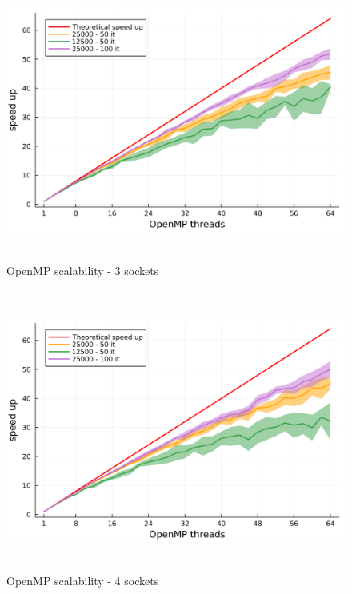 \documentclass[
  letterpaper,
  DIV=11,
  numbers=noendperiod]{scrartcl}
\begin{document}
\begin{figure}

{\centering \includegraphics[width=\textwidth,height=3.64583in]{img/epyc_3_sockets.png}

}

\caption{OpenMP scalability - 3 sockets}

\end{figure}

\begin{figure}

{\centering \includegraphics[width=\textwidth,height=3.64583in]{img/epyc_4_sockets.png}

}

\caption{OpenMP scalability - 4 sockets}

\end{figure}
\end{document}
